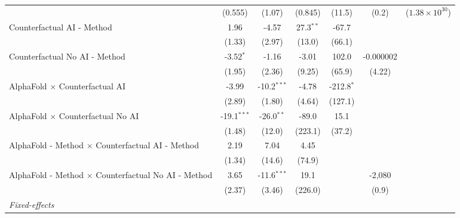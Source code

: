 \begin{tabular}{lcccccc}
                                                              & (0.555)       & (1.07)        & (0.845)       & (11.5)       & (0.2)           & ($1.38\times 10^{30}$)\\    
   Counterfactual AI - Method                                 & 1.96          & -4.57         & 27.3$^{**}$   & -67.7        &                 &   \\   
                                                              & (1.33)        & (2.97)        & (13.0)        & (66.1)       &                 &   \\   
   Counterfactual No AI - Method                              & -3.52$^{*}$   & -1.16         & -3.01         & 102.0        & -0.000002       &   \\   
                                                              & (1.95)        & (2.36)        & (9.25)        & (65.9)       & (4.22)          &   \\   
   AlphaFold $\times$ Counterfactual AI                       & -3.99         & -10.2$^{***}$ & -4.78         & -212.8$^{*}$ &                 &   \\   
                                                              & (2.89)        & (1.80)        & (4.64)        & (127.1)      &                 &   \\   
   AlphaFold $\times$ Counterfactual No AI                    & -19.1$^{***}$ & -26.0$^{**}$  & -89.0         & 15.1         &                 &   \\   
                                                              & (1.48)        & (12.0)        & (223.1)       & (37.2)       &                 &   \\   
   AlphaFold - Method $\times$ Counterfactual AI - Method     & 2.19          & 7.04          & 4.45          &              &                 &   \\   
                                                              & (1.34)        & (14.6)        & (74.9)        &              &                 &   \\   
   AlphaFold - Method $\times$ Counterfactual No AI - Method  & 3.65          & -11.6$^{***}$ & 19.1          &              & -2,080          &   \\   
                                                              & (2.37)        & (3.46)        & (226.0)       &              & (0.9)           &   \\   
   \midrule
   \emph{Fixed-effects}\\

\end{tabular}
